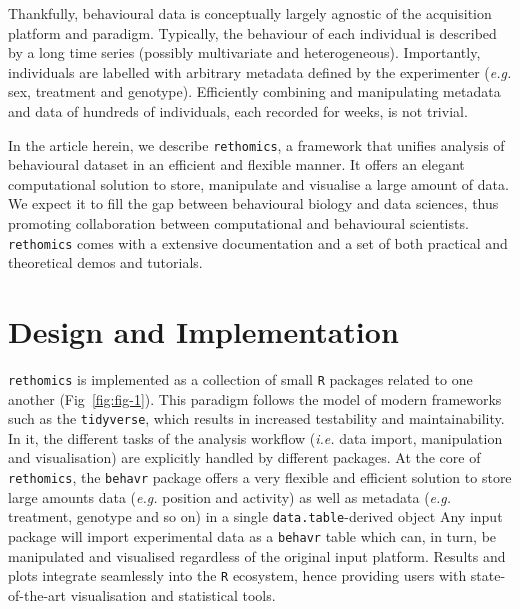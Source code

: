 \documentclass[10pt,letterpaper]{article}\usepackage[]{graphicx}\usepackage[]{color}
\begin{document}
Thankfully, behavioural data is conceptually largely agnostic of the acquisition platform and paradigm. 	
Typically, the behaviour of each individual is described by a long time series (possibly multivariate and heterogeneous).
Importantly, individuals are labelled with arbitrary metadata defined by the experimenter (\emph{e.g.} sex, treatment and genotype).
Efficiently combining and manipulating metadata and data of hundreds of individuals, each recorded for weeks, is not trivial.

In the article herein, we describe \texttt{rethomics}, a framework that unifies analysis of behavioural dataset in an efficient and flexible manner.
It offers an elegant computational solution to store, manipulate and visualise a large amount of data.
We expect it to fill the gap between behavioural biology and data sciences, thus promoting collaboration between computational and behavioural scientists.
\texttt{rethomics} comes with a extensive documentation and a set of both practical and theoretical demos and tutorials.


\section*{Design and Implementation}

\texttt{rethomics} is implemented as a collection of small \texttt{R}\cite{r_core_team_r:_2017} packages related to one another (Fig~\ref{fig:fig-1}).
This paradigm follows the model of modern frameworks such as the \texttt{tidyverse}\cite{wickham_tidyverse:_2017}, which results in increased testability and maintainability.
In it, the different tasks of the analysis workflow (\emph{i.e.} data import, manipulation and visualisation)
are explicitly handled by different packages.
At the core of \texttt{rethomics}, the \texttt{behavr} package offers a very flexible and efficient solution to store large amounts data (\emph{e.g.} position and activity) as well as metadata (\emph{e.g.} treatment, genotype and so on) in a single \texttt{data.table}-derived object\cite{dowle_data.table:_2017}
Any input package will import experimental data as a \texttt{behavr} table which can, in turn, be manipulated and visualised regardless of the original input platform.
Results and plots integrate seamlessly into the \texttt{R} ecosystem, hence providing users with state-of-the-art visualisation and statistical tools.

\end{document}
